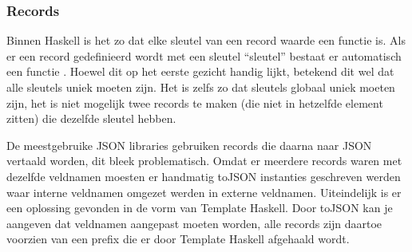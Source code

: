 \subsubsection{Records}
Binnen Haskell is het zo dat elke sleutel van een record waarde een functie is. Als er een record gedefinieerd wordt met een sleutel ``sleutel'' bestaat er automatisch een functie . Hoewel dit op het eerste gezicht handig lijkt, betekend dit wel dat alle sleutels uniek moeten zijn. Het is zelfs zo dat sleutels globaal uniek moeten zijn, het is niet mogelijk twee records te maken (die niet in hetzelfde  element zitten) die dezelfde sleutel hebben.

De meestgebruike JSON libraries gebruiken records die daarna naar JSON vertaald worden, dit bleek problematisch. Omdat er meerdere records waren met dezelfde veldnamen moesten er handmatig toJSON instanties geschreven werden waar interne veldnamen omgezet werden in externe veldnamen. Uiteindelijk is er een oplossing gevonden in de vorm van Template Haskell. Door toJSON kan je aangeven dat veldnamen aangepast moeten worden, alle records zijn daartoe voorzien van een prefix die er door Template Haskell afgehaald wordt.


